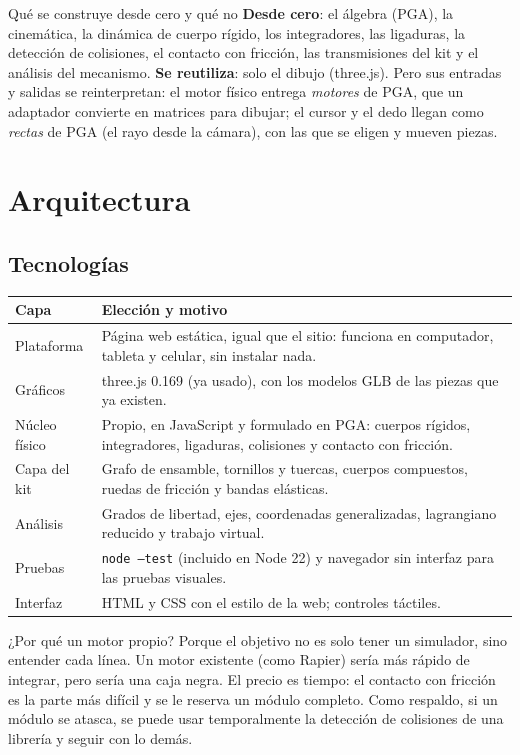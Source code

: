 \documentclass[11pt,a4paper]{article}
\numberwithin{equation}{section}
\begin{document}
\begin{decision}{Qué se construye desde cero y qué no}
\textbf{Desde cero}: el álgebra (PGA), la cinemática, la dinámica de cuerpo rígido, los integradores, las ligaduras,
la detección de colisiones, el contacto con fricción, las transmisiones del kit y el análisis del mecanismo.
\textbf{Se reutiliza}: solo el dibujo (three.js). Pero sus entradas y salidas se reinterpretan: el motor físico
entrega \emph{motores} de PGA, que un adaptador convierte en matrices para dibujar; el cursor y el dedo llegan como
\emph{rectas} de PGA (el rayo desde la cámara), con las que se eligen y mueven piezas.
\end{decision}

\section{Arquitectura}

\subsection{Tecnologías}
\begin{tabularx}{\linewidth}{@{}l Y@{}}
\toprule
\textbf{Capa} & \textbf{Elección y motivo}\\
\midrule
Plataforma & Página web estática, igual que el sitio: funciona en computador, tableta y celular, sin instalar nada.\\
Gráficos & three.js 0.169 (ya usado), con los modelos GLB de las piezas que ya existen.\\
Núcleo físico & Propio, en JavaScript y formulado en PGA: cuerpos rígidos, integradores, ligaduras, colisiones y
  contacto con fricción.\\
Capa del kit & Grafo de ensamble, tornillos y tuercas, cuerpos compuestos, ruedas de fricción y bandas
  elásticas.\\
Análisis & Grados de libertad, ejes, coordenadas generalizadas, lagrangiano reducido y trabajo virtual.\\
Pruebas & \texttt{node --test} (incluido en Node 22) y navegador sin interfaz para las pruebas visuales.\\
Interfaz & HTML y CSS con el estilo de la web; controles táctiles.\\
\bottomrule
\end{tabularx}

\begin{decision}{¿Por qué un motor propio?}
Porque el objetivo no es solo tener un simulador, sino entender cada línea. Un motor existente (como Rapier) sería
más rápido de integrar, pero sería una caja negra. El precio es tiempo: el contacto con fricción es la parte más
difícil y se le reserva un módulo completo. Como respaldo, si un módulo se atasca, se puede usar temporalmente la
detección de colisiones de una librería y seguir con lo demás.
\end{decision}
\end{document}
